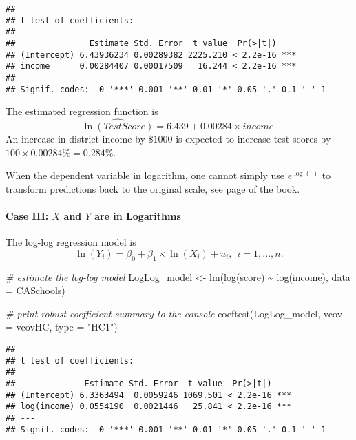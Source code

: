 \documentclass[
]{article}
\newenvironment{Shaded}{\begin{snugshade}}{\end{snugshade}}
\newcommand{\AttributeTok}[1]{\textcolor[rgb]{0.77,0.63,0.00}{#1}}
\newcommand{\CommentTok}[1]{\textcolor[rgb]{0.56,0.35,0.01}{\textit{#1}}}
\newcommand{\FunctionTok}[1]{\textcolor[rgb]{0.00,0.00,0.00}{#1}}
\newcommand{\NormalTok}[1]{#1}
\newcommand{\OtherTok}[1]{\textcolor[rgb]{0.56,0.35,0.01}{#1}}
\newcommand{\SpecialCharTok}[1]{\textcolor[rgb]{0.00,0.00,0.00}{#1}}
\newcommand{\StringTok}[1]{\textcolor[rgb]{0.31,0.60,0.02}{#1}}
\begin{document}
\begin{verbatim}
## 
## t test of coefficients:
## 
##               Estimate Std. Error  t value  Pr(>|t|)    
## (Intercept) 6.43936234 0.00289382 2225.210 < 2.2e-16 ***
## income      0.00284407 0.00017509   16.244 < 2.2e-16 ***
## ---
## Signif. codes:  0 '***' 0.001 '**' 0.01 '*' 0.05 '.' 0.1 ' ' 1
\end{verbatim}

The estimated regression function is
\[\widehat{\ln(TestScore)} = 6.439 + 0.00284 \times income.\] An
increase in district income by \(\$1000\) is expected to increase test
scores by \(100\times 0.00284 \% = 0.284\%\).

When the dependent variable in logarithm, one cannot simply use
\(e^{\log(\cdot)}\) to transform predictions back to the original scale,
see page of the book.

\hypertarget{case-iii-x-and-y-are-in-logarithms}{%
\paragraph*{\texorpdfstring{Case III: \(X\) and \(Y\) are in
Logarithms}{Case III: X and Y are in Logarithms}}\label{case-iii-x-and-y-are-in-logarithms}}

The log-log regression model is
\[\ln(Y_i) = \beta_0 + \beta_1 \times \ln(X_i) + u_i, \ \ i=1,...,n.\]

\begin{Shaded}
\begin{Highlighting}[]
\CommentTok{\# estimate the log{-}log model}
\NormalTok{LogLog\_model }\OtherTok{\textless{}{-}} \FunctionTok{lm}\NormalTok{(}\FunctionTok{log}\NormalTok{(score) }\SpecialCharTok{\textasciitilde{}} \FunctionTok{log}\NormalTok{(income), }\AttributeTok{data =}\NormalTok{ CASchools)}

\CommentTok{\# print robust coefficient summary to the console}
\FunctionTok{coeftest}\NormalTok{(LogLog\_model, }
         \AttributeTok{vcov =}\NormalTok{ vcovHC, }\AttributeTok{type =} \StringTok{"HC1"}\NormalTok{)}
\end{Highlighting}
\end{Shaded}

\begin{verbatim}
## 
## t test of coefficients:
## 
##              Estimate Std. Error  t value  Pr(>|t|)    
## (Intercept) 6.3363494  0.0059246 1069.501 < 2.2e-16 ***
## log(income) 0.0554190  0.0021446   25.841 < 2.2e-16 ***
## ---
## Signif. codes:  0 '***' 0.001 '**' 0.01 '*' 0.05 '.' 0.1 ' ' 1
\end{verbatim}
\end{document}
